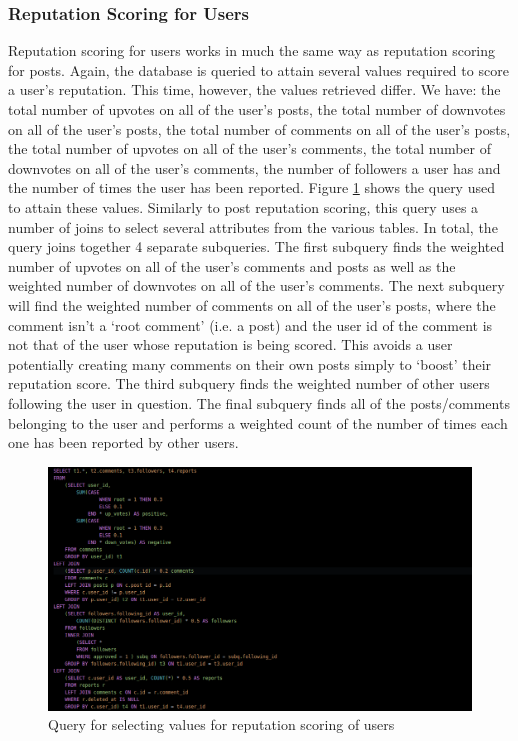 \subsubsection{Reputation Scoring for Users}
Reputation scoring for users works in much the same way as reputation scoring for posts. Again, the database is queried to attain several values required to score a user's reputation. This time, however, the values retrieved differ. We have: the total number of upvotes on all of the user's posts, the total number of downvotes on all of the user's posts, the total number of comments on all of the user's posts, the total number of upvotes on all of the user's comments, the total number of downvotes on all of the user's comments, the number of followers a user has and the number of times the user has been reported. Figure \ref{fig:UserRepQuery} shows the query used to attain these values. Similarly to post reputation scoring, this query uses a number of joins to select several attributes from the various tables. In total, the query joins together 4 separate subqueries. The first subquery finds the weighted number of upvotes on all of the user's comments and posts as well as the weighted number of downvotes on all of the user's comments. The next subquery will find the weighted number of comments on all of the user's posts, where the comment isn't a `root comment' (i.e. a post) and the user id of the comment is not that of the user whose reputation is being scored. This avoids a user potentially creating many comments on their own posts simply to `boost' their reputation score. The third subquery finds the weighted number of other users following the user in question. The final subquery finds all of the posts/comments belonging to the user and performs a weighted count of the number of times each one has been reported by other users.

\begin{figure}[H]
\centering
\includegraphics[width=\textwidth]{Images/Implementation/UserRepQuery}
\caption{Query for selecting values for reputation scoring of users}
\label{fig:UserRepQuery}
\end{figure}

